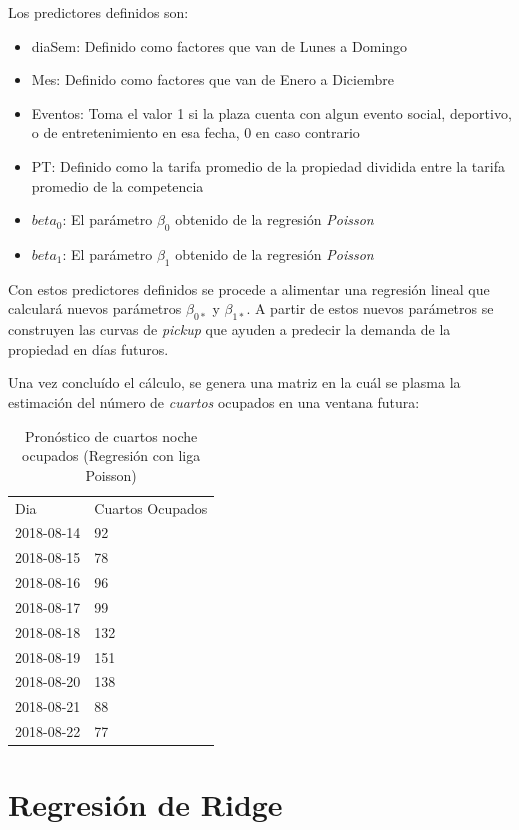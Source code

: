 Los predictores definidos son:

\begin{itemize}
  \item diaSem: Definido como factores que van de Lunes a Domingo
  \item Mes: Definido como factores que van de Enero a Diciembre
  \item Eventos: Toma el valor 1 si la plaza cuenta con algun evento social, deportivo, o de entretenimiento en esa fecha, 0 en caso contrario
  \item PT: Definido como la tarifa promedio de la propiedad dividida entre la tarifa promedio de la competencia
  \item $beta_0$: El parámetro $\beta_0$ obtenido de la regresión \emph{Poisson}
  \item $beta_1$: El parámetro $\beta_1$ obtenido de la regresión \emph{Poisson}
\end{itemize}


Con estos predictores definidos se procede a alimentar una regresión lineal que calculará nuevos parámetros $\beta_{0*}$ y $\beta_{1*}$. A partir de estos nuevos parámetros se construyen las curvas de \emph{pickup} que ayuden a predecir la demanda de la propiedad en días futuros.

Una vez concluído el cálculo, se genera una matriz en la cuál se plasma la estimación del número de \emph{cuartos} ocupados en una ventana futura:

\begin{table}[H]
\centering
\begin{tabular}{ll}
Dia        & Cuartos Ocupados \\
2018-08-14 & 92               \\
2018-08-15 & 78               \\
2018-08-16 & 96               \\
2018-08-17 & 99               \\
2018-08-18 & 132              \\
2018-08-19 & 151              \\
2018-08-20 & 138              \\
2018-08-21 & 88               \\
2018-08-22 & 77              
\end{tabular}
\caption{Pronóstico de cuartos noche ocupados (Regresión con liga Poisson)} 
\end{table}


\section*{Regresión de Ridge}

